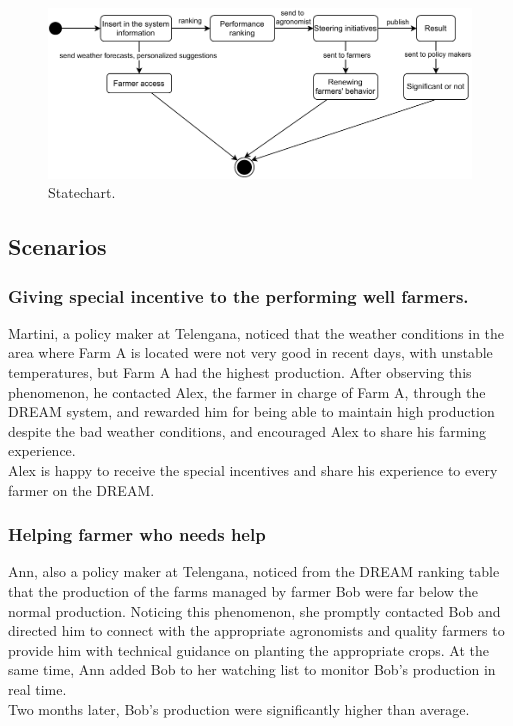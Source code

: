 \documentclass[../../main.tex]{subfiles}
\begin{document}
\begin{figure}[H]
    \centering
    \includegraphics[width=\textwidth]{RASD/image/State_Chart.pdf}
    \caption{Statechart.}
\end{figure}

\subsection{Scenarios}


\subsubsection{Giving special incentive to the performing well farmers.}

  Martini, a policy maker at Telengana, noticed that the weather conditions in the area where Farm A is located were not very good in recent days, with unstable temperatures, but Farm A had the highest production. After observing this phenomenon, he contacted Alex, the farmer in charge of Farm A, through the DREAM system, and rewarded him for being able to maintain high production despite the bad weather conditions, and encouraged Alex to share his farming experience.\\
  Alex is happy to receive the special incentives and share his experience to every farmer on the DREAM.


\subsubsection{Helping farmer who needs help}

  Ann, also a policy maker at Telengana, noticed from the DREAM ranking table that the production of the farms managed by farmer Bob were far below the normal production. Noticing this phenomenon, she promptly contacted Bob and directed him to connect with the appropriate agronomists and quality farmers to provide him with technical guidance on planting the appropriate crops. At the same time, Ann added Bob to her watching list to monitor Bob's production in real time.\\
  Two months later, Bob's production were significantly higher than average.
\end{document}
